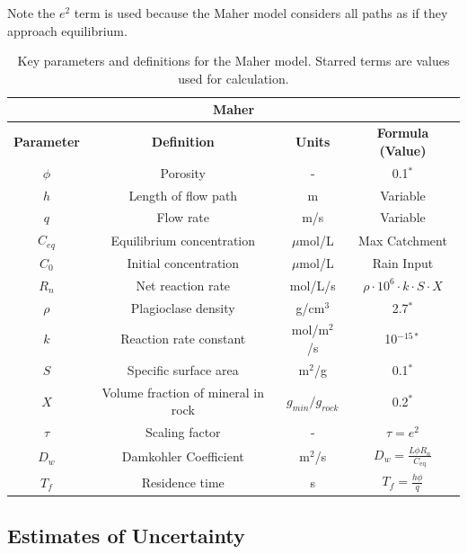 Note the $e^2$ term is used because the Maher model considers all paths as if they approach equilibrium.

\begin{table}[H]
    \centering
    \renewcommand{\arraystretch}{1.3} %
    \begin{tabular}{|c|c|c|c|}
        \hline  %
        \multicolumn{4}{|c|}{\textbf{Maher}} \\  
        \hline
        \textbf{Parameter} & \textbf{Definition} & \textbf{Units} & \textbf{Formula (Value)} \\
        \hline
        $\phi$ & Porosity & - & 0.1$^*$ \\
        $h$ & Length of flow path & m & Variable \\
        $q$ & Flow rate & m/s & Variable \\
        $C_{eq}$ & Equilibrium concentration & $\mu$mol/L & Max Catchment \\
        $C_0$ & Initial concentration & $\mu$mol/L & Rain Input \\
        $R_n$ & Net reaction rate & mol/L/s & $\rho \cdot 10^6 \cdot k \cdot S \cdot X $ \\
        $\rho$ & Plagioclase density & g/cm$^3$ & 2.7$^*$ \\
        $k$ & Reaction rate constant & mol/m$^2$/s & 10$^{-15*}$ \\
        $S$ & Specific surface area & m$^2$/g & 0.1$^*$ \\
        $X$ & Volume fraction of mineral in rock & $g_{min}/g_{rock}$& 0.2$^*$ \\
        $\tau$ & Scaling factor & - & $\tau = e^2$ \\
        $D_w$ & Damkohler Coefficient & m$^2$/s & $D_w = \frac{L \phi R_n}{C_{\text{eq}}}$ \\
        $T_f$ & Residence time & s & $T_f = \frac{h \phi}{q}$ \\
        \hline
    \end{tabular}
    \caption{Key parameters and definitions for the Maher model. Starred terms are values used for calculation.}
    \label{tab:parameters2}
\end{table}

\FloatBarrier


\subsection{Estimates of Uncertainty}

